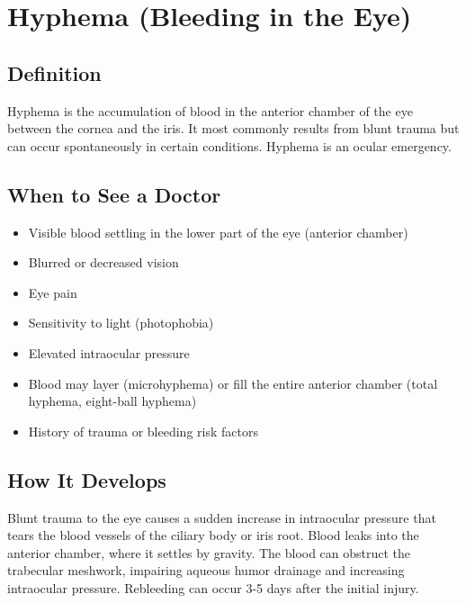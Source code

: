 \chapter{Hyphema (Bleeding in the Eye)}

\section*{Definition}
Hyphema is the accumulation of blood in the anterior chamber of the eye between the cornea and the iris. It most commonly results from blunt trauma but can occur spontaneously in certain conditions. Hyphema is an ocular emergency.

\section*{When to See a Doctor}
\begin{itemize}
\item Visible blood settling in the lower part of the eye (anterior chamber)
\item Blurred or decreased vision
\item Eye pain
\item Sensitivity to light (photophobia)
\item Elevated intraocular pressure
\item Blood may layer (microhyphema) or fill the entire anterior chamber (total hyphema, eight-ball hyphema)
\item History of trauma or bleeding risk factors
\end{itemize}

\section*{How It Develops}
Blunt trauma to the eye causes a sudden increase in intraocular pressure that tears the blood vessels of the ciliary body or iris root. Blood leaks into the anterior chamber, where it settles by gravity. The blood can obstruct the trabecular meshwork, impairing aqueous humor drainage and increasing intraocular pressure. Rebleeding can occur 3-5 days after the initial injury.


